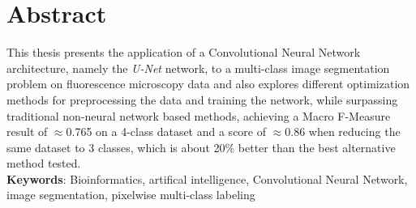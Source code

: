 \chapter*{Abstract}

\noindent This thesis presents the application of a Convolutional Neural Network architecture, namely the \textit{U-Net} network, to a multi-class image segmentation problem on fluorescence microscopy data and also explores different optimization methods for preprocessing the data and training the network, while surpassing traditional non-neural network based methods, achieving a Macro F-Measure result of $\approx$0.765 on a 4-class dataset and a score of $\approx$0.86 when reducing the same dataset to 3 classes, which is about 20\% better than the best alternative method tested.\\

\noindent \textbf{Keywords}: Bioinformatics, artifical intelligence, Convolutional Neural Network, image segmentation, pixelwise multi-class labeling